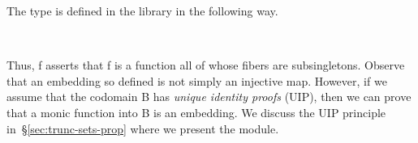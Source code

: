 
The  type is defined in the \typetopology library in the following way.
\ccpad
\begin{code}%
\>[1]\AgdaSpace{}%
\AgdaSymbol{:}\AgdaSpace{}%
\AgdaSymbol{(}\AgdaSpace{}%
\AgdaSpace{}%
\AgdaSymbol{)}\AgdaSpace{}%
\AgdaSpace{}%
\AgdaSpace{}%
\AgdaSpace{}%
\AgdaSpace{}%
\<%
\\
%
\>[1]\AgdaSpace{}%
\AgdaSpace{}%
\AgdaSymbol{=}\AgdaSpace{}%
\AgdaSpace{}%
\AgdaSpace{}%
\AgdaSpace{}%
\AgdaSpace{}%
\AgdaSymbol{(}\AgdaSpace{}%
\AgdaSpace{}%
\AgdaSymbol{)}\<%
\end{code}
\ccpad
Thus,  \ab f asserts that \ab f is a function all of whose fibers are subsingletons. Observe that an embedding so defined is not simply an injective map. However, if we assume that the codomain \ab B has \emph{unique identity proofs} (UIP), then we can prove that a monic function into \ab B is an embedding. We discuss the UIP principle in~\S\ref{sec:trunc-sets-prop} where we present the  module.


